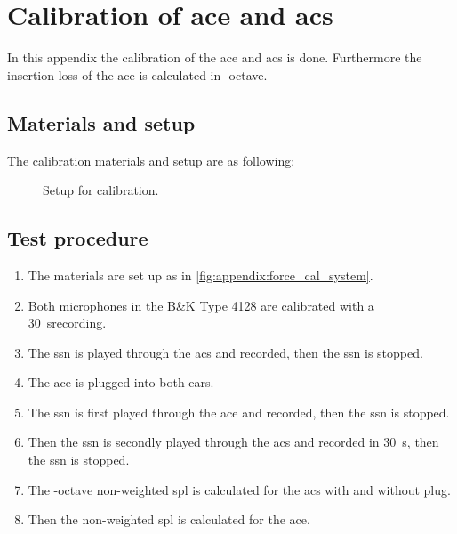 \chapter{Calibration of \gls{ace} and \gls{acs}}
\label{append:cal_of_transducer}
In this appendix the calibration of the \gls{ace} and \gls{acs} is done. Furthermore the insertion loss of the \gls{ace} is calculated in -octave.

\section*{Materials and setup}
The calibration materials and setup are as following:


\startequipment
{}
\stopequipment


\begin{figure}[H]
\centering
\def\svgwidth{\columnwidth}

\caption{Setup for calibration.}
		\label{fig:appendix:force_cal_system}
\end{figure}

\section*{Test procedure}


\begin{enumerate}
\item The materials are set up as in \autoref{fig:appendix:force_cal_system}.
\item Both microphones in the B\&K Type 4128 are calibrated with a \SI{30}{\second}recording.
\item The \gls{ssn} is played through the \gls{acs} and recorded, then the \gls{ssn} is stopped.
\item The \gls{ace} is plugged into both ears. 
\item The \gls{ssn} is first played through the \gls{ace} and recorded, then the \gls{ssn} is stopped.
\item Then the \gls{ssn} is secondly played through the \gls{acs} and recorded in \SI{30}{\second}, then the \gls{ssn} is stopped.
\item The -octave non-weighted \gls{spl} is calculated for the \gls{acs} with and without plug. 
\item Then the non-weighted \gls{spl} is calculated for the \gls{ace}.
\end{enumerate}

